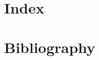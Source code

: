 \documentclass{article}
\begin{document}
\sloppy






\section{Index}


\section{Bibliography}


\end{document}
